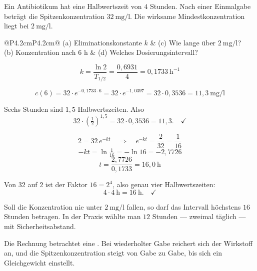 \begin{aufgabe}
Ein Antibiotikum hat eine Halbwertszeit von $4$ Stunden. Nach einer Einmalgabe beträgt die Spitzenkonzentration $32\ \mathrm{mg/l}$. Die wirksame Mindestkonzentration liegt bei $2\ \mathrm{mg/l}$.
\begin{center}
{\small
\renewcommand{\arraystretch}{1.35}
\begin{tabular}{@{}P{4.2cm}P{4.2cm}@{}}
\toprule
(a) Eliminationskonstante $k$ & (c) Wie lange über $2\ \mathrm{mg/l}$?\\
(b) Konzentration nach $6$ h & (d) Welches Dosierungsintervall?\\
\bottomrule
\end{tabular}}
\end{center}

\loesung
{}
\[ k = \frac{\ln 2}{T_{1/2}} = \frac{0{,}6931}{4} = 0{,}1733\ \mathrm{h}^{-1} \]

\[ c(6) = 32 \cdot e^{-0{,}1733 \cdot 6} = 32 \cdot e^{-1{,}0397} = 32 \cdot 0{,}3536 = 11{,}3\ \mathrm{mg/l} \]

 Sechs Stunden sind $1{,}5$ Halbwertszeiten. Also
\[ 32 \cdot \left(\tfrac12\right)^{1{,}5} = 32 \cdot 0{,}3536 = 11{,}3 . \quad \checkmark \]

\[ 2 = 32\,e^{-kt} \quad\Longrightarrow\quad e^{-kt} = \frac{2}{32} = \frac{1}{16} \]
\[ -kt = \ln\tfrac{1}{16} = -\ln 16 = -2{,}7726 \]
\[ t = \frac{2{,}7726}{0{,}1733} = 16{,}0\ \text{h} \]

 Von $32$ auf $2$ ist der Faktor $16 = 2^4$, also genau vier Halbwertszeiten:
\[ 4 \cdot 4\ \text{h} = 16\ \text{h} . \quad \checkmark \]

Soll die Konzentration nie unter $2\ \mathrm{mg/l}$ fallen, so darf das Intervall höchstens $16$ Stunden betragen. In der Praxis wählte man $12$ Stunden --- zweimal täglich --- mit Sicherheitsabstand.

Die Rechnung betrachtet eine . Bei wiederholter Gabe reichert sich der Wirkstoff an, und die Spitzenkonzentration steigt von Gabe zu Gabe, bis sich ein Gleichgewicht einstellt.

\begin{center}
\begin{minipage}{0.86\textwidth}
\end{minipage}
\end{center}
\end{aufgabe}

